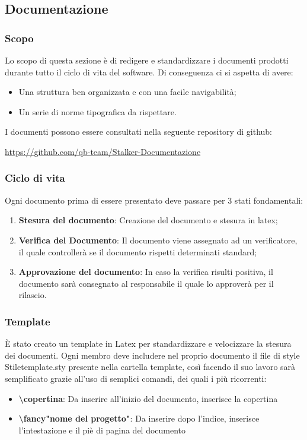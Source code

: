 \subsection{Documentazione}
\subsubsection{Scopo}
Lo scopo di questa sezione è di redigere e standardizzare i documenti prodotti durante tutto il ciclo di vita del software. 
Di conseguenza ci si aspetta di avere:
\begin{itemize}
\item Una struttura ben organizzata e con una facile navigabilità;
\item Un serie di norme tipografica da rispettare.
\end{itemize}
I documenti possono essere consultati nella seguente repository di github:
\begin{center}
\url{https://github.com/qb-team/Stalker-Documentazione}
\end{center}



\subsubsection{Ciclo di vita}
Ogni documento prima di essere presentato deve passare per 3 stati fondamentali:
\begin{enumerate}
\item \textbf{Stesura del documento}: Creazione del documento e stesura in latex;
\item \textbf{Verifica del Documento}: Il documento viene assegnato ad un verificatore, il quale controllerà se il documento rispetti determinati standard;
\item \textbf{Approvazione del documento}: In caso la verifica risulti positiva, il documento sarà consegnato al responsabile il quale lo approverà per il rilascio.
\end{enumerate}

\subsubsection{Template}
È stato creato un template in Latex per standardizzare e velocizzare la stesura dei documenti.
Ogni membro deve includere nel proprio documento il file di style Stiletemplate.sty presente nella cartella template, così facendo il suo lavoro sarà semplificato grazie all'uso di semplici comandi, dei quali i più ricorrenti:
\begin{itemize}
\item \textbf{\textbackslash copertina{}}: Da inserire all'inizio del documento, inserisce la copertina
\item \textbf{\textbackslash fancy"nome del progetto"{}}: Da inserire dopo l'indice, inserisce l'intestazione e il piè di pagina del documento
\end{itemize}

